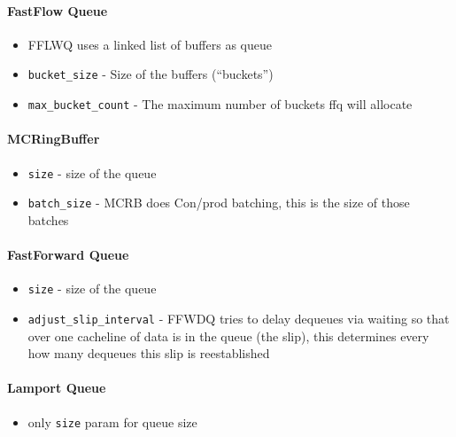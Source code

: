 \paragraph{FastFlow Queue}
\begin{itemize}
    \item FFLWQ uses a linked list of buffers as queue 
    \item \texttt{bucket\_size} - Size of the buffers (``buckets'')
    \item \texttt{max\_bucket\_count} - The maximum number of buckets ffq will allocate
\end{itemize}

\paragraph{MCRingBuffer}
\begin{itemize}
    \item \texttt{size} - size of the queue
    \item \texttt{batch\_size} - MCRB does Con/prod batching, this is the size of those batches
\end{itemize}

\paragraph{FastForward Queue}
\begin{itemize}
    \item \texttt{size} - size of the queue
    \item \texttt{adjust\_slip\_interval} - FFWDQ tries to delay dequeues via waiting so that over one
        cacheline of data is in the queue (the slip), this determines every how many dequeues this slip is
        reestablished 
\end{itemize}

\paragraph{Lamport Queue}
\begin{itemize}
    \item only \texttt{size} param for queue size
\end{itemize}

